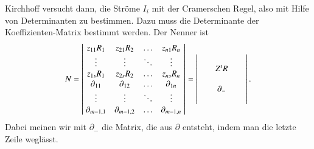 Kirchhoff versucht dann, die Ströme $I_i$ mit der Cramerschen 
Regel, also mit Hilfe von Determinanten zu bestimmen.
Dazu muss die Determinante der Koeffizienten-Matrix bestimmt werden.
Der Nenner ist
\begin{equation}
N=\left|\;\begin{matrix}
z_{11}R_1       &z_{21}R_2       &\dots &z_{n1}R_n       \\
\vdots          &\vdots          &\ddots&\vdots          \\
z_{1s}R_1       &z_{2s}R_2       &\dots &z_{ns}R_n       \\
\partial_{11}   &\partial_{12}   &\dots &\partial_{1n}   \\
\vdots          &\vdots          &\ddots&\vdots          \\
\partial_{m-1,1}&\partial_{m-1,2}&\dots &\partial_{m-1,n}
\end{matrix}\;\right|
=
\left|\;
\begin{tabular}{>{$}c<{$}>{$}c<{$}>{$}c<{$}}
&          &\\
&Z^tR      &\\
&          &\\
&\partial_-&\\
&          &
\end{tabular}
\;\right|.
\label{Ndenominator}
\end{equation}
Dabei meinen wir mit $\partial_-$ die Matrix, die aus $\partial$
entsteht, indem man die letzte Zeile weglässt.

